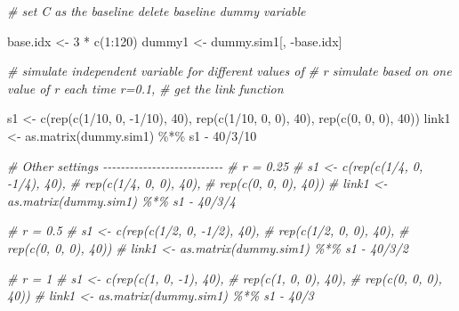 \documentclass[
  12pt,
]{krantz}
\makeatletter
\newenvironment{Shaded}{\begin{snugshade}}{\end{snugshade}}
\newcommand{\CommentTok}[1]{\textcolor[rgb]{0.37,0.37,0.37}{\textit{#1}}}
\newcommand{\DecValTok}[1]{\textcolor[rgb]{0.06,0.06,0.06}{#1}}
\newcommand{\FunctionTok}[1]{\textcolor[rgb]{0,0,0}{#1}}
\newcommand{\NormalTok}[1]{#1}
\newcommand{\OtherTok}[1]{\textcolor[rgb]{0.37,0.37,0.37}{#1}}
\newcommand{\SpecialCharTok}[1]{\textcolor[rgb]{0,0,0}{#1}}
\newenvironment{kframe}{%
\medskip{}
\setlength{\fboxsep}{.8em}
 \def\at@end@of@kframe{}%
 \ifinner\ifhmode%
  \def\at@end@of@kframe{\end{minipage}}%
  \begin{minipage}{\columnwidth}%
 \fi\fi%
 \def\FrameCommand##1{\hskip\@totalleftmargin \hskip-\fboxsep
 \colorbox{shadecolor}{##1}\hskip-\fboxsep
     \hskip-\linewidth \hskip-\@totalleftmargin \hskip\columnwidth}%
 \MakeFramed {\advance\hsize-\width
   \@totalleftmargin\z@ \linewidth\hsize
   \@setminipage}}%
 {\par\unskip\endMakeFramed%
 \at@end@of@kframe}
\renewenvironment{Shaded}{\begin{kframe}}{\end{kframe}}
\makeatother
\begin{document}
\begin{Shaded}
\begin{Highlighting}[]
    \CommentTok{\# set \textquotesingle{}C\textquotesingle{} as the baseline delete baseline dummy variable}
    
\NormalTok{    base.idx }\OtherTok{\textless{}{-}} \DecValTok{3} \SpecialCharTok{*} \FunctionTok{c}\NormalTok{(}\DecValTok{1}\SpecialCharTok{:}\DecValTok{120}\NormalTok{)}
\NormalTok{    dummy1 }\OtherTok{\textless{}{-}}\NormalTok{ dummy.sim1[, }\SpecialCharTok{{-}}\NormalTok{base.idx]}
    
    \CommentTok{\# simulate independent variable for different values of}
    \CommentTok{\# r simulate based on one value of r each time r=0.1,}
    \CommentTok{\# get the link function}
    
\NormalTok{    s1 }\OtherTok{\textless{}{-}} \FunctionTok{c}\NormalTok{(}\FunctionTok{rep}\NormalTok{(}\FunctionTok{c}\NormalTok{(}\DecValTok{1}\SpecialCharTok{/}\DecValTok{10}\NormalTok{, }\DecValTok{0}\NormalTok{, }\SpecialCharTok{{-}}\DecValTok{1}\SpecialCharTok{/}\DecValTok{10}\NormalTok{), }\DecValTok{40}\NormalTok{), }
            \FunctionTok{rep}\NormalTok{(}\FunctionTok{c}\NormalTok{(}\DecValTok{1}\SpecialCharTok{/}\DecValTok{10}\NormalTok{, }\DecValTok{0}\NormalTok{, }\DecValTok{0}\NormalTok{), }\DecValTok{40}\NormalTok{), }
            \FunctionTok{rep}\NormalTok{(}\FunctionTok{c}\NormalTok{(}\DecValTok{0}\NormalTok{, }\DecValTok{0}\NormalTok{, }\DecValTok{0}\NormalTok{), }\DecValTok{40}\NormalTok{))}
\NormalTok{    link1 }\OtherTok{\textless{}{-}} \FunctionTok{as.matrix}\NormalTok{(dummy.sim1) }\SpecialCharTok{\%*\%}\NormalTok{ s1 }\SpecialCharTok{{-}} \DecValTok{40}\SpecialCharTok{/}\DecValTok{3}\SpecialCharTok{/}\DecValTok{10}
    
    \CommentTok{\# Other settings  {-}{-}{-}{-}{-}{-}{-}{-}{-}{-}{-}{-}{-}{-}{-}{-}{-}{-}{-}{-}{-}{-}{-}{-}{-}{-}{-}}
    \CommentTok{\# r = 0.25}
    \CommentTok{\# s1 \textless{}{-} c(rep(c(1/4, 0, {-}1/4), 40), }
    \CommentTok{\#        rep(c(1/4, 0, 0), 40), }
    \CommentTok{\#        rep(c(0, 0, 0), 40))}
    \CommentTok{\# link1 \textless{}{-} as.matrix(dummy.sim1) \%*\% s1 {-} 40/3/4}
    
    \CommentTok{\# r = 0.5}
    \CommentTok{\# s1 \textless{}{-} c(rep(c(1/2, 0, {-}1/2), 40), }
    \CommentTok{\#        rep(c(1/2, 0, 0), 40), }
    \CommentTok{\#        rep(c(0, 0, 0), 40))}
    \CommentTok{\# link1 \textless{}{-} as.matrix(dummy.sim1) \%*\% s1 {-} 40/3/2}
    
    \CommentTok{\# r = 1}
    \CommentTok{\# s1 \textless{}{-} c(rep(c(1, 0, {-}1), 40), }
    \CommentTok{\#        rep(c(1, 0, 0), 40), }
    \CommentTok{\#        rep(c(0, 0, 0), 40))}
    \CommentTok{\# link1 \textless{}{-} as.matrix(dummy.sim1) \%*\% s1 {-} 40/3}
    

\end{Highlighting}
\end{Shaded}
\end{document}
